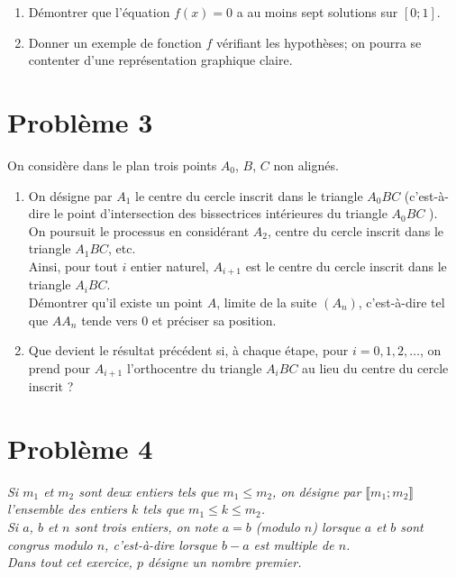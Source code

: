 \documentclass[landscape,twocolumn,leqno,a4paper,10pt]{report} %
\newcommand\n{\noindent}
\renewcommand{\leq}{\leqslant}
\begin{document}
\begin{enumerate}
	\item Démontrer que l'équation $f(x)=0$ a au moins sept solutions sur $[0 ; 1]$.
	\item Donner un exemple de fonction $f$ vérifiant les hypothèses; on pourra se contenter d'une représentation graphique claire.
\end{enumerate}


\section{Problème 3}

\n On considère dans le plan trois points $A_{0}$, $B$, $C$ non alignés.

\begin{enumerate}
	\item On désigne par $A_{1}$ le centre du cercle inscrit dans le triangle $A_{0} B C$ (c'est-à-dire le point d'intersection des bissectrices intérieures du triangle $A_{0} B C$ ).\\
	On poursuit le processus en considérant $A_{2}$, centre du cercle inscrit dans le triangle $A_{1} B C$, etc.\\
	Ainsi, pour tout $i$ entier naturel, $A_{i+1}$ est le centre du cercle inscrit dans le triangle $A_{i} B C$.\\
	Démontrer qu'il existe un point $A$, limite de la suite $\left(A_{n}\right)$, c'est-à-dire tel que $A A_{n}$ tende vers 0 et préciser sa position.
	\item Que devient le résultat précédent si, à chaque étape, pour $i=0,1,2, \ldots$, on prend pour $A_{i+1}$ l'orthocentre du triangle $A_{i} B C$ au lieu du centre du cercle inscrit ?
\end{enumerate}


\section{Problème 4}

\n \textit{Si $m_{1}$ et $m_{2}$ sont deux entiers tels que $m_{1} \leq m_{2}$, on désigne par $\llbracket m_{1} ; m_{2}\rrbracket$ l'ensemble des entiers $k$ tels que $m_{1} \leq k \leq m_{2}$.\\
Si $a$, $b$ et $n$ sont trois entiers, on note $a=b$ (modulo $n$) lorsque $a$ et $b$ sont congrus modulo $n$, c'est-à-dire lorsque $b-a$ est multiple de $n$.\\
Dans tout cet exercice, $p$ désigne un nombre premier.}
\end{document}
